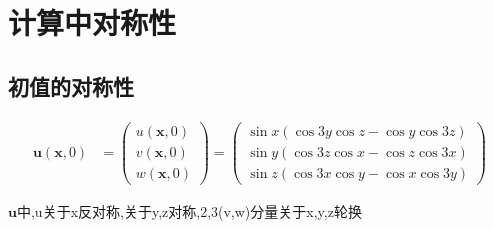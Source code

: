 \documentclass[UTF8]{ctexart}
\begin{document}
 
 
\section{计算中对称性}

\subsection{初值的对称性}

  \begin{equation*}
  \begin{split}
      \mathbf{u}(\mathbf{x},0)&= \left(\begin{matrix}
                          u(\mathbf{x},0) \\
                          v(\mathbf{x},0) \\
                          w(\mathbf{x},0)
                        \end{matrix}\right)
                     = \left(\begin{matrix}
                          \sin x(\cos 3y\cos z - \cos y \cos 3z) \\
                           \sin y(\cos 3z\cos x - \cos z \cos 3x) \\
                           \sin z(\cos 3x\cos y - \cos x \cos 3y)
                        \end{matrix}\right)
  \end{split}
  \end{equation*}

$\mathbf{u}$中,u关于x反对称,关于y,z对称,2,3(v,w)分量关于x,y,z轮换
\end{document}
